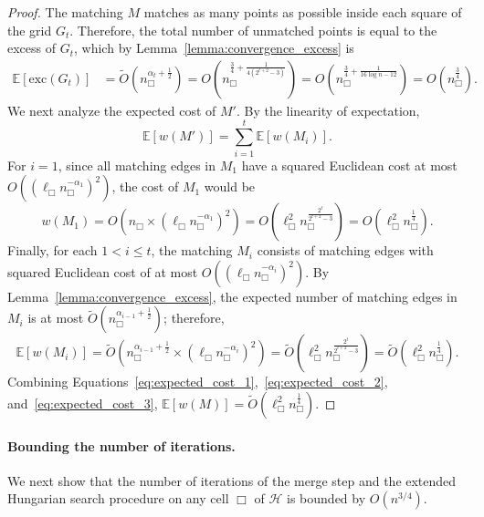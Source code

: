 \documentclass[11pt,onecolumn]{article}
\def\mcH{{\mathcal{H}}}
\def\mbE{{\mathbb{E}}}
\newcommand{\cell}{\Box}
\newcommand{\excess}{\mathrm{exc}}
\begin{document}
\begin{proof}
    The matching $M$ matches as many points as possible inside each square of the grid $G_t$. Therefore, the total number of unmatched points is equal to the excess of $G_t$, which by Lemma~\ref{lemma:convergence_excess} is 
    \begin{align}
        \mbE[\excess(G_t)] &= \tilde{O}(n_\cell^{\alpha_t+\frac{1}{2}}) = O(n_\cell^{\frac{3}{4}+\frac{1}{4(2^{t+2}-3)}}) = O(n_\cell^{\frac{3}{4}+\frac{1}{16\log n-12}}) = O(n_\cell^{\frac{3}{4}}).
    \end{align}
    We next analyze the expected cost of $M'$. By the linearity of expectation,
    \begin{equation}
        \mbE[w(M')] = \sum_{i=1}^t \mbE[w(M_i)].
        \label{eq:expected_cost_1}
    \end{equation}
    For $i=1$, since all matching edges in $M_1$ have a squared Euclidean cost at most $O((\ell_\cell n_\cell^{-\alpha_1})^2)$, the cost of $M_1$ would be 
    \begin{equation}
        w(M_1) = O(n_\cell\times (\ell_\cell n_\cell^{-\alpha_1})^2) = O(\ell_\cell^2 n_\cell^{\frac{2^t}{2^{t+2}-3}}) = O(\ell_\cell^2 n_\cell^{\frac{1}{4}}).\label{eq:expected_cost_2}
    \end{equation}
    Finally, for each $1<i\le t$, the matching $M_i$ consists of matching edges with squared Euclidean cost of at most $O((\ell_\cell n_\cell^{-\alpha_i})^2)$. By Lemma~\ref{lemma:convergence_excess}, the expected number of matching edges in $M_i$ is at most $\tilde{O}(n_\cell^{\alpha_{i-1}+\frac{1}{2}})$; therefore,
    \begin{equation}
        \mbE[w(M_i)] = \tilde{O}(n_\cell^{\alpha_{i-1}+\frac{1}{2}}\times (\ell_\cell n_\cell^{-\alpha_i})^2) = \tilde{O}(\ell_\cell^2 n_\cell^{\frac{2^t}{2^{t+2}-3}}) = \tilde{O}(\ell_\cell^2 n_\cell^{\frac{1}{4}}).\label{eq:expected_cost_3}
    \end{equation}
    Combining Equations~\eqref{eq:expected_cost_1},~\eqref{eq:expected_cost_2}, and~\eqref{eq:expected_cost_3}, $\mbE[w(M)] = \tilde{O}(\ell_\cell^2 n_\cell^{\frac{1}{4}})$.
\end{proof}

\paragraph{Bounding the number of iterations.} We next show that the number of iterations of the merge step and the extended Hungarian search procedure on any cell $\cell$ of $\mcH$ is bounded by $O(n^{3/4})$.
\end{document}
